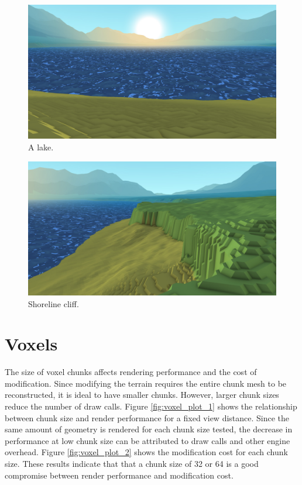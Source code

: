 \begin{figure}
	\centering
		\includegraphics[width=1.0\textwidth]{figures/Screenshot000005.jpg}
	\caption{A lake.}
	\label{fig:screenshot05}
\end{figure}

\begin{figure}
	\centering
		\includegraphics[width=1.0\textwidth]{figures/Screenshot000006.jpg}
	\caption{Shoreline cliff.}
	\label{fig:screenshot06}
\end{figure}

\section{Voxels}

The size of voxel chunks affects rendering performance and the cost of modification.
Since modifying the terrain requires the entire chunk mesh to be reconstructed, it is ideal to have smaller chunks.
However, larger chunk sizes reduce the number of draw calls.
Figure \ref{fig:voxel_plot_1} shows the relationship between chunk size and render performance for a fixed view distance.
Since the same amount of geometry is rendered for each chunk size tested, the decrease in performance at low chunk size can be attributed to draw calls and other engine overhead.
Figure \ref{fig:voxel_plot_2} shows the modification cost for each chunk size.
These results indicate that that a chunk size of 32 or 64 is a good compromise between render performance and modification cost.

